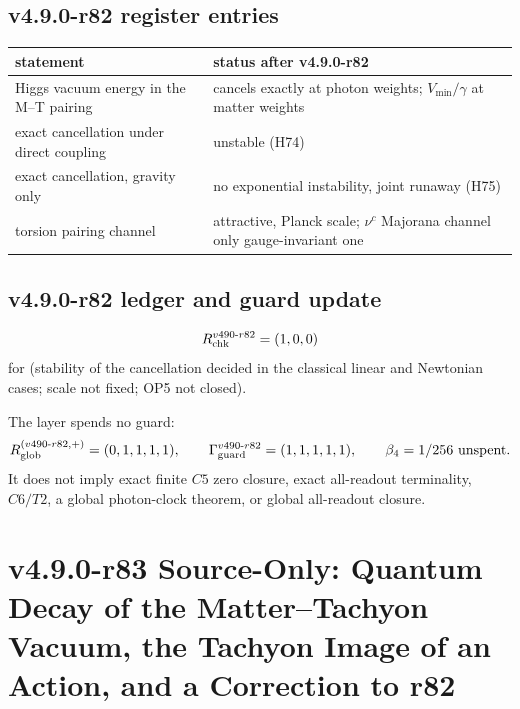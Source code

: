 \subsection*{v4.9.0-r82 register entries}
\label{subsec:v490-r82-register}

\begin{center}
\small
\begin{tabular}{@{}>{\raggedright\arraybackslash}p{}>{\raggedright\arraybackslash}p{}@{}}
\toprule
statement & status after v4.9.0-r82\\
\midrule
Higgs vacuum energy in the M--T pairing & cancels exactly at photon weights; \(V_{\min}/\gamma\) at matter weights\\
exact cancellation under direct coupling & unstable (H74)\\
exact cancellation, gravity only & no exponential instability, joint runaway (H75)\\
torsion pairing channel & attractive, Planck scale; \(\nu^c\) Majorana channel only gauge-invariant one\\
\bottomrule
\end{tabular}
\end{center}

\subsection*{v4.9.0-r82 ledger and guard update}
\label{subsec:v490-r82-ledger-guard}

\[
R_{\rm chk}^{v490\text{-}r82}=(1,0,0)
\]
for (stability of the cancellation decided in the classical linear and Newtonian cases; scale not fixed; OP5 not closed).

The layer spends no guard:
\[
R_{\rm glob}^{(v490\text{-}r82,+)}=(0,1,1,1,1),
\qquad
\Gamma_{\rm guard}^{v490\text{-}r82}=(1,1,1,1,1),
\qquad
\beta_4=1/256\ \text{unspent}.
\]
It does not imply exact finite \(C5\) zero closure, exact all-readout terminality,
\(C6/T2\), a global photon-clock theorem, or global all-readout closure.


\clearpage
\section*{v4.9.0-r83 Source-Only: Quantum Decay of the Matter--Tachyon Vacuum, the Tachyon Image of an Action, and a Correction to r82}
\label{sec:v490-r83-vacuum-decay-image}

